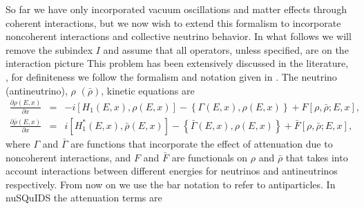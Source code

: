 \documentclass[3p,12pt]{elsarticle}
\newcommand{\ttf}{\ttfamily}
\newcommand{\pa}[2]{\frac{\partial #1}{\partial #2}}
\begin{document}
So far we have only incorporated vacuum oscillations and matter
effects through coherent interactions, but we now wish to extend this
formalism to incorporate noncoherent interactions and collective
neutrino behavior. In what follows we will remove the subindex $I$ and
assume that all operators, unless specified, are on the interaction picture 
This problem has been extensively discussed in the literature,
\citep{Sigl:1992fn,Duan:2010tk,Strack:qd,Zhang:2013ay,
 Cirelli:mw,Blennow:2007tw,Arguelles:2012cf}, for definiteness we
follow the formalism and notation given in
\citep{Gonzalez-Garcia:2005xw}.
The neutrino (antineutrino), $\rho$ $(\bar\rho)$, kinetic equations are
\begin{subequations}
\begin{eqnarray}
\pa{\rho(E,x)}{x} &=& -i [ H_1 (E,x), \rho(E,x) ] - \left\{ \Gamma(E,x),
  \rho(E,x) \right\} + F\left[\rho,\bar\rho;E,x\right] ,\\
%
\pa{\bar\rho(E,x)}{x} &=& i [ H^*_1 (E,x), \bar\rho(E,x) ] - \left\{ \bar\Gamma(E,x),
  \rho(E,x) \right\} + \bar F\left[\rho,\bar\rho;E,x\right] ,
\end{eqnarray}
\end{subequations}
where $\Gamma$ and $\bar\Gamma$  are functions that incorporate the effect of attenuation due to
noncoherent interactions, and $F$ and $\bar F$  are  functionals on
$\rho$ and $\bar\rho$ that takes into account interactions between
different energies for neutrinos and antineutrinos respectively. From
now on we use the bar notation to refer to antiparticles.
In {\ttf nuSQuIDS} the attenuation terms are
\end{document}

